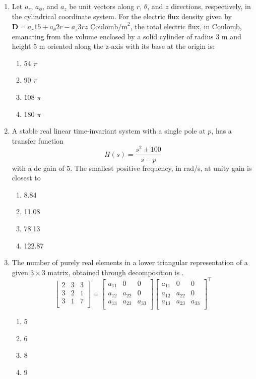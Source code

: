 \documentclass[journal,12pt,onecolumn]{IEEEtran}
\theoremstyle{remark}
\begin{document}
\begin{enumerate}
    \item Let $a_r$, $a_\phi$, and $a_z$ be unit vectors along $r$, $\theta$, and $z$ directions, respectively, in the cylindrical coordinate system. For the electric flux density given by
    $
    \mathbf{D} = a_r 15 + a_\theta 2r - a_z 3rz \text{ Coulomb/m}^2\text{}
    $,
    the total electric flux, in Coulomb, emanating from the volume enclosed by a solid cylinder of radius 3 m and height 5 m oriented along the z-axis with its base at the origin is:
    \begin{enumerate}
        \item 54 $\pi$
        \item 90 $\pi$
        \item 108 $\pi$
        \item 180 $\pi$
    \end{enumerate}

    \item A stable real linear time-invariant system with a single pole at $p$, has a transfer function
    $$
    H(s) = \frac{s^2 + 100}{s-p}
    $$
    with a dc gain of 5. The smallest positive frequency, in rad/s, at unity gain is closest to
    \begin{enumerate}
        \item 8.84
        \item 11.08
        \item 78.13
        \item 122.87
    \end{enumerate}

    \item The number of purely real elements in a lower triangular representation of a given $3 \times 3$ matrix, obtained through decomposition is {\underline{\hspace{1cm}}}.
    \[
\begin{bmatrix}
2 & 3 & 3 \\
3 & 2 & 1 \\
3 & 1 & 7 \\
\end{bmatrix}
=
\begin{bmatrix}
a_{11} & 0 & 0 \\
a_{12} & a_{22} & 0 \\
a_{13} & a_{23} & a_{33} \\
\end{bmatrix}
\begin{bmatrix}
a_{11} & 0 & 0 \\
a_{12} & a_{22} & 0 \\
a_{13} & a_{23} & a_{33} \\
\end{bmatrix}^{\top}
\]
    \begin{enumerate}
        \item 5
        \item 6
        \item 8
        \item 9
    \end{enumerate}


\end{enumerate}
\end{document}
